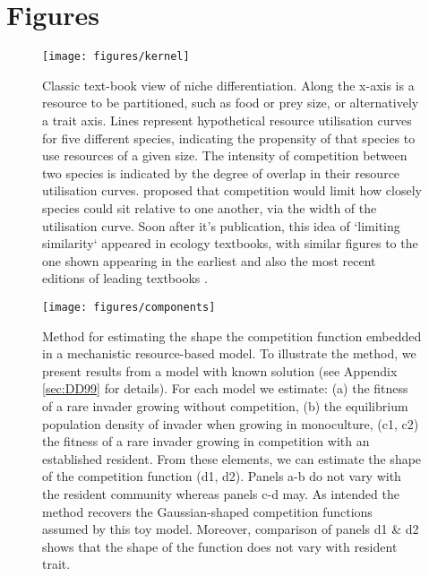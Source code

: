 \documentclass[a4paper,11pt]{article}
\begin{document}
\section{Figures}

\begin{figure}[h]
  \centering
  \texttt{[image: figures/kernel]}
  \caption{Classic text-book view of niche differentiation.  Along the
    x-axis is a resource to be partitioned, such as food or prey size,
    or alternatively a trait axis.  Lines represent hypothetical
    resource utilisation curves for five different species, indicating
    the propensity of that species to use resources of a given size.
    The intensity of competition between two species is indicated by
    the degree of overlap in their resource utilisation
    curves. \citet{MacArthur-1967} proposed that competition would
    limit how closely species could sit relative to one another, via
    the width of the utilisation curve. Soon after it's publication,
    this idea of `limiting similarity` appeared in ecology textbooks,
    with similar figures to the one shown appearing in the earliest
    and also the most recent editions of leading textbooks
    \citep{Begon-1986, Begon-2006, Krebs-1978, Krebs-2013,
      Ricklefs-1973, Ricklefs-1999}.}
  \label{fig:competition-kernels}
\end{figure}

\begin{figure}[h]
 \centering
 \texttt{[image: figures/components]}
 \caption{Method for estimating the shape the competition function embedded
  in a mechanistic resource-based model. To illustrate the method, we present
  results from a model with known solution \citep{Dieckmann-1999} (see Appendix
  \ref{sec:DD99} for details). For each
  model we estimate: (a) the fitness of a rare invader growing without competition,
  (b) the equilibrium population density of invader when growing in monoculture,
  (c1, c2) the fitness of a rare invader growing in competition with an established
  resident. From these elements, we can estimate the shape of the competition
  function (d1, d2). Panels a-b do not vary with the resident community whereas
  panels c-d may.  As intended the method recovers the Gaussian-shaped competition
  functions assumed by this toy model. Moreover, comparison of panels d1 \& d2
  shows that the shape of the function does not vary with resident trait.
  \label{fig:components}}
\end{figure}
\end{document}
